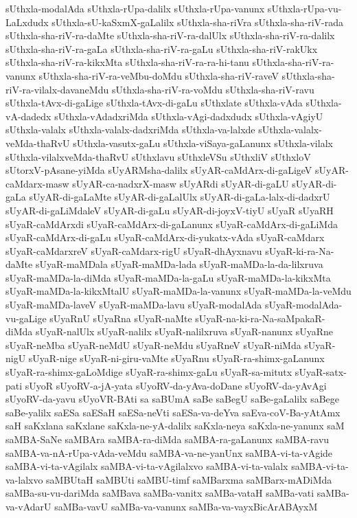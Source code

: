 {sUthxla-modalAda
sUthxla-rUpa-dalilx
sUthxla-rUpa-vanunx
sUthxla-rUpa-vu-LaLxdudx
sUthxla-sU-kaSxmX-gaLalilx
sUthxla-sha-riVra
sUthxla-sha-riV-rada
sUthxla-sha-riV-ra-daMte
sUthxla-sha-riV-ra-dalUlx
sUthxla-sha-riV-ra-dalilx
sUthxla-sha-riV-ra-gaLa
sUthxla-sha-riV-ra-gaLu
sUthxla-sha-riV-rakUkx
sUthxla-sha-riV-ra-kikxMta
sUthxla-sha-riV-ra-ra-hi-tanu
sUthxla-sha-riV-ra-vanunx
sUthxla-sha-riV-ra-veMbu-doMdu
sUthxla-sha-riV-raveV
sUthxla-sha-riV-ra-vilalx-davaneMdu
sUthxla-sha-riV-ra-voMdu
sUthxla-sha-riV-ravu
sUthxla-tAvx-di-gaLige
sUthxla-tAvx-di-gaLu
sUthxlate
sUthxla-vAda
sUthxla-vA-dadedx
sUthxla-vAdadxriMda
sUthxla-vAgi-dadxdudx
sUthxla-vAgiyU
sUthxla-valalx
sUthxla-valalx-dadxriMda
sUthxla-va-lalxde
sUthxla-valalx-veMda-thaRvU
sUthxla-vasutx-gaLu
sUthxla-viSaya-gaLanunx
sUthxla-vilalx
sUthxla-vilalxveMda-thaRvU
sUthxlavu
sUthxleVSu
sUthxliV
sUthxloV
sUtorxV-pAsane-yiMda
sUyARMsha-dalilx
sUyAR-caMdArx-di-gaLigeV
sUyAR-caMdarx-masw
sUyAR-ca-nadxrX-masw
sUyARdi
sUyAR-di-gaLU
sUyAR-di-gaLa
sUyAR-di-gaLaMte
sUyAR-di-gaLalUlx
sUyAR-di-gaLa-lalx-di-dadxrU
sUyAR-di-gaLiMdaleV
sUyAR-di-gaLu
sUyAR-di-joyxV-tiyU
sUyaR
sUyaRH
sUyaR-caMdArxdi
sUyaR-caMdArx-di-gaLanunx
sUyaR-caMdArx-di-gaLiMda
sUyaR-caMdArx-di-gaLu
sUyaR-caMdArx-di-yukatx-vAda
sUyaR-caMdarx
sUyaR-caMdarxreV
sUyaR-caMdarx-rigU
sUyaR-dhAyxnavu
sUyaR-ki-ra-Na-daMte
sUyaR-maMDala
sUyaR-maMDa-lada
sUyaR-maMDa-la-da-lilxruva
sUyaR-maMDa-la-diMda
sUyaR-maMDa-la-gaLu
sUyaR-maMDa-la-kikxMta
sUyaR-maMDa-la-kikxMtalU
sUyaR-maMDa-la-vanunx
sUyaR-maMDa-la-veMdu
sUyaR-maMDa-laveV
sUyaR-maMDa-lavu
sUyaR-modalAda
sUyaR-modalAda-vu-gaLige
sUyaRnU
sUyaRna
sUyaR-naMte
sUyaR-na-ki-ra-Na-saMpakaR-diMda
sUyaR-nalUlx
sUyaR-nalilx
sUyaR-nalilxruva
sUyaR-nanunx
sUyaRne
sUyaR-neMba
sUyaR-neMdU
sUyaR-neMdu
sUyaRneV
sUyaR-niMda
sUyaR-nigU
sUyaR-nige
sUyaR-ni-giru-vaMte
sUyaRnu
sUyaR-ra-shimx-gaLanunx
sUyaR-ra-shimx-gaLoMdige
sUyaR-ra-shimx-gaLu
sUyaR-sa-mitutx
sUyaR-satx-pati
sUyoR
sUyoRV-a-jA-yata
sUyoRV-da-yAva-doDane
sUyoRV-da-yAvAgi
sUyoRV-da-yavu
sUyoVR-BAti
sa
saBUmA
saBe
saBegU
saBe-gaLalilx
saBege
saBe-yalilx
saESa
saESaH
saESa-neVti
saESa-va-deYva
saEva-coV-Ba-yAtAmx
saH
saKxlana
saKxlane
saKxla-ne-yA-dalilx
saKxla-neya
saKxla-ne-yanunx
saM
saMBA-SaNe
saMBAra
saMBA-ra-diMda
saMBA-ra-gaLanunx
saMBA-ravu
saMBA-va-nA-rUpa-vAda-veMdu
saMBA-va-ne-yanUnx
saMBA-vi-ta-vAgide
saMBA-vi-ta-vAgilalx
saMBA-vi-ta-vAgilalxvo
saMBA-vi-ta-valalx
saMBA-vi-ta-va-lalxvo
saMBUtaH
saMBUti
saMBU-timf
saMBarxma
saMBarx-mADiMda
saMBa-su-vu-dariMda
saMBava
saMBa-vanitx
saMBa-vataH
saMBa-vati
saMBa-va-vAdarU
saMBa-vavU
saMBa-va-vanunx
saMBa-va-vayxBicArABAyxM
}
